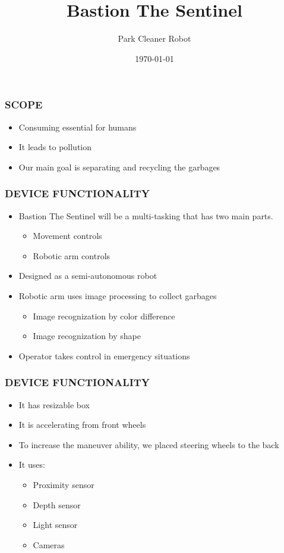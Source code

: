 \documentclass{beamer}
\title{Bastion The Sentinel}
\author{Park Cleaner Robot}
\institute{Istanbul Bilgi University}
\date{\today}
\begin{document}
 \frame{\titlepage}
 
 \begin{frame}
  \frametitle{SCOPE}
  \begin{itemize}
   \item Consuming essential for humans
   \item It leads to pollution
   \item Our main goal is separating and recycling the garbages
  \end{itemize}
 \end{frame}

 \begin{frame}
  \frametitle{DEVICE FUNCTIONALITY}
  \begin{itemize}
   \item Bastion The Sentinel will be a multi-tasking that has two main parts.
   \begin{itemize}
    \item Movement controls
    \item Robotic arm controls
   \end{itemize}
   \item Designed as a semi-autonomous robot
   \item Robotic arm uses image processing to collect garbages
   \begin{itemize}
    \item Image recognization by color difference
    \item Image recognization by shape
   \end{itemize}
   \item Operator takes control in emergency situations
  \end{itemize}
 \end{frame}

 \begin{frame}
  \frametitle{DEVICE FUNCTIONALITY}
  \begin{itemize}
   \item It has resizable box
   \item It is accelerating from front wheels
   \item To increase the maneuver ability, we placed steering wheels to the back
   \item It uses:
   \begin{itemize}
    \item Proximity sensor
    \item Depth sensor
    \item Light sensor
    \item Cameras
   \end{itemize}
  \end{itemize}
 \end{frame}
\end{document}
